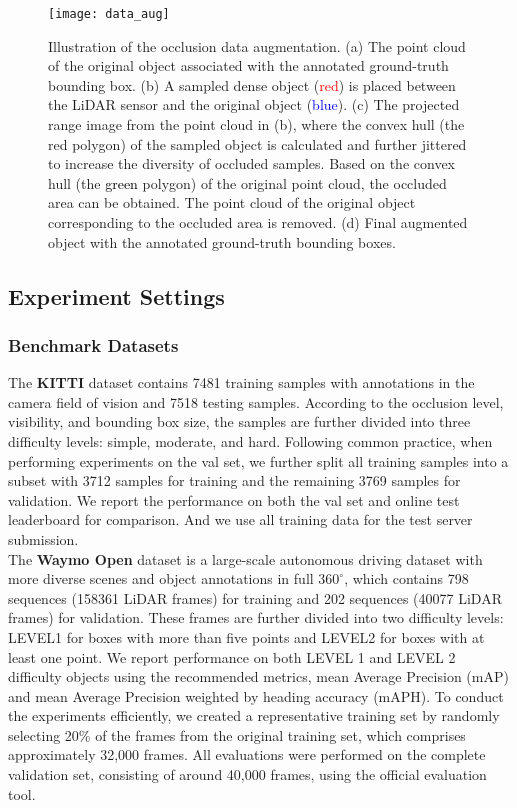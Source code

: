\documentclass[twocolumn]{svjour3}
\newcommand{\revise}[1]{\textcolor{black}{#1}}
\begin{document}
\begin{figure*}[htp]
\centering
\texttt{[image: data\_aug]}
\caption{Illustration of the occlusion data augmentation.
(a) The point cloud of the original object associated with the annotated ground-truth bounding box. (b) A sampled dense object (\textcolor{red}{red}) is placed between the LiDAR sensor and the original object (\textcolor{blue}{blue}). (c) The projected range image from the point cloud in (b), where the convex hull (the red polygon) of the sampled object is calculated and further jittered to increase the diversity of occluded samples. Based on the convex hull (the \revise{green} polygon) of the original point cloud, the occluded area can be obtained.
The point cloud of the original object corresponding to the occluded area is removed. (d) Final augmented object with the annotated ground-truth bounding boxes.}
\label{fig:data_aug}
\end{figure*}

\subsection{Experiment Settings} \label{experiment_settings}

\subsubsection{Benchmark Datasets} 
The \textbf{KITTI} dataset contains 7481 training samples with annotations in the camera field of vision and 7518 testing samples. According to the occlusion level, visibility, and bounding box size, the samples are further divided into three difficulty levels: simple, moderate, and hard. Following common practice, when performing experiments on the val set, we further split all training samples into a subset with 3712 samples for training and the remaining 3769 samples for validation. We report the performance on both the val set and online test leaderboard for comparison. And we use all training data for the test server submission.\\

\noindent The \textbf{Waymo Open} dataset is a large-scale autonomous driving dataset with more diverse scenes and object annotations in full $360^\circ$, which contains 798 sequences (158361 LiDAR frames) for training and 202 sequences (40077 LiDAR frames) for validation. These frames are further divided into two difficulty levels: LEVEL1 for boxes with more than five points and LEVEL2 for boxes with at least one point.
We report performance on both LEVEL 1 and LEVEL 2 difficulty objects using the recommended metrics, mean Average Precision (mAP) and mean Average Precision weighted by heading accuracy (mAPH). To conduct the experiments efficiently, we created a representative training set by randomly selecting 20\% of the frames from the original training set, which comprises approximately 32,000 frames. All evaluations were performed on the complete validation set, consisting of around 40,000 frames, using the official evaluation tool.
\end{document}
